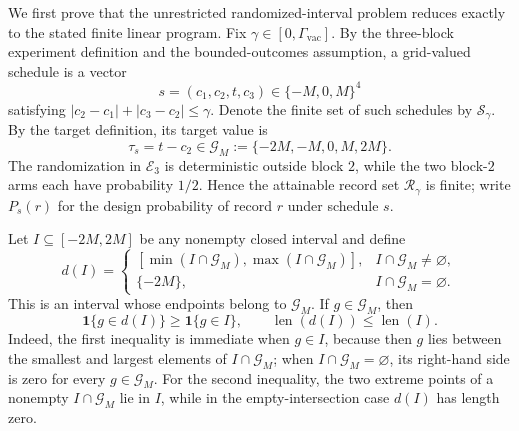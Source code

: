We first prove that the unrestricted randomized-interval problem reduces exactly to the stated finite linear program.  Fix \(\gamma\in[0,\Gamma_{\mathrm{vac}}]\).  By the three-block experiment definition and the bounded-outcomes assumption, a grid-valued schedule is a vector
\[
s=(c_1,c_2,t,c_3)\in\{-M,0,M\}^{4}
\]
satisfying \(|c_2-c_1|+|c_3-c_2|\le\gamma\).  Denote the finite set of such schedules by \(\mathcal S_\gamma\).  By the target definition, its target value is
\[
\tau_s=t-c_2\in\mathcal G_M:=\{-2M,-M,0,M,2M\}.
\]
The randomization in \(\mathcal E_3\) is deterministic outside block \(2\), while the two block-\(2\) arms each have probability \(1/2\).  Hence the attainable record set \(\mathcal R_\gamma\) is finite; write \(P_s(r)\) for the design probability of record \(r\) under schedule \(s\).

Let \(I\subseteq[-2M,2M]\) be any nonempty closed interval and define
\[
d(I)=
\begin{cases}
[\min(I\cap\mathcal G_M),\max(I\cap\mathcal G_M)],&I\cap\mathcal G_M\ne\varnothing,\\
\{-2M\},&I\cap\mathcal G_M=\varnothing.
\end{cases}
\]
This is an interval whose endpoints belong to \(\mathcal G_M\).  If \(g\in\mathcal G_M\), then
\[
\mathbf 1\{g\in d(I)\}\ge \mathbf 1\{g\in I\},
\qquad
\operatorname{len}(d(I))\le \operatorname{len}(I).
\]
Indeed, the first inequality is immediate when \(g\in I\), because then \(g\) lies between the smallest and largest elements of \(I\cap\mathcal G_M\); when \(I\cap\mathcal G_M=\varnothing\), its right-hand side is zero for every \(g\in\mathcal G_M\).  For the second inequality, the two extreme points of a nonempty \(I\cap\mathcal G_M\) lie in \(I\), while in the empty-intersection case \(d(I)\) has length zero.

